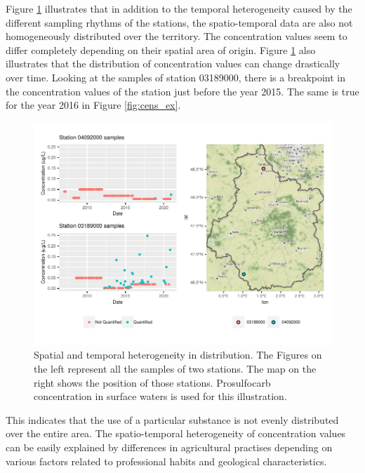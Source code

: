 Figure \ref{fig:het_spa_ex} illustrates that in addition to the temporal heterogeneity caused by the different sampling rhythms of the stations, the spatio-temporal data are also not homogeneously distributed over the territory. The concentration values seem to differ completely depending on their spatial area of origin. Figure \ref{fig:het_spa_ex} also illustrates that the distribution of concentration values can change drastically over time. Looking at the samples of station 03189000, there is a breakpoint in the concentration values of the station just before the year 2015. The same is true for the year 2016 in Figure \ref{fig:cens_ex}. 
\begin{figure}[htbp]
    \centering
    \includegraphics{figs/Chap3/Het_resC.pdf}
    \caption{Spatial and temporal heterogeneity in distribution. The Figures on the left represent all the samples of two stations. The map on the right shows the position of those stations. Prosulfocarb concentration in surface waters is used for this illustration.}
    \label{fig:het_spa_ex}
\end{figure}
This indicates that the use of a particular substance is not evenly distributed over the entire area. The spatio-temporal heterogeneity of concentration values can be easily explained by differences in agricultural practises depending on various factors related to professional habits and geological characteristics.


